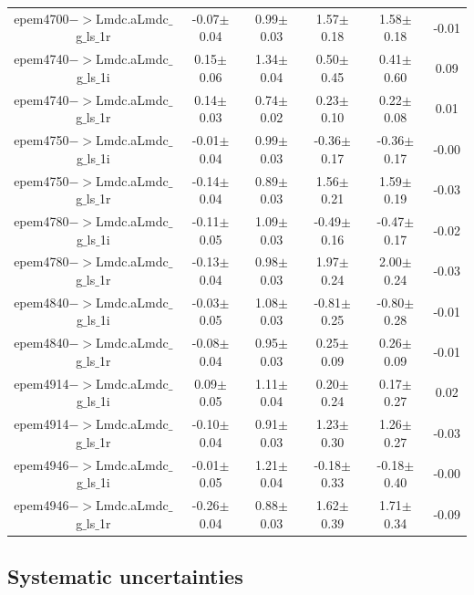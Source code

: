 \begin{table}[h]
{\begin{tabular}{cccccc}
        epem4700$->$Lmdc.aLmdc$\_$g$\_$ls$\_$1r & -0.07$\pm$0.04 & 0.99$\pm$0.03 & 1.57$\pm$0.18 & 1.58$\pm$0.18 & -0.01 \\
        epem4740$->$Lmdc.aLmdc$\_$g$\_$ls$\_$1i & 0.15$\pm$0.06 & 1.34$\pm$0.04 & 0.50$\pm$0.45 & 0.41$\pm$0.60 & 0.09 \\
        epem4740$->$Lmdc.aLmdc$\_$g$\_$ls$\_$1r & 0.14$\pm$0.03 & 0.74$\pm$0.02 & 0.23$\pm$0.10 & 0.22$\pm$0.08 & 0.01 \\
        epem4750$->$Lmdc.aLmdc$\_$g$\_$ls$\_$1i & -0.01$\pm$0.04 & 0.99$\pm$0.03 & -0.36$\pm$0.17 & -0.36$\pm$0.17 & -0.00 \\
        epem4750$->$Lmdc.aLmdc$\_$g$\_$ls$\_$1r & -0.14$\pm$0.04 & 0.89$\pm$0.03 & 1.56$\pm$0.21 & 1.59$\pm$0.19 & -0.03 \\
        epem4780$->$Lmdc.aLmdc$\_$g$\_$ls$\_$1i & -0.11$\pm$0.05 & 1.09$\pm$0.03 & -0.49$\pm$0.16 & -0.47$\pm$0.17 & -0.02 \\
        epem4780$->$Lmdc.aLmdc$\_$g$\_$ls$\_$1r & -0.13$\pm$0.04 & 0.98$\pm$0.03 & 1.97$\pm$0.24 & 2.00$\pm$0.24 & -0.03 \\
        epem4840$->$Lmdc.aLmdc$\_$g$\_$ls$\_$1i & -0.03$\pm$0.05 & 1.08$\pm$0.03 & -0.81$\pm$0.25 & -0.80$\pm$0.28 & -0.01 \\
        epem4840$->$Lmdc.aLmdc$\_$g$\_$ls$\_$1r & -0.08$\pm$0.04 & 0.95$\pm$0.03 & 0.25$\pm$0.09 & 0.26$\pm$0.09 & -0.01 \\
        epem4914$->$Lmdc.aLmdc$\_$g$\_$ls$\_$1i & 0.09$\pm$0.05 & 1.11$\pm$0.04 & 0.20$\pm$0.24 & 0.17$\pm$0.27 & 0.02 \\
        epem4914$->$Lmdc.aLmdc$\_$g$\_$ls$\_$1r & -0.10$\pm$0.04 & 0.91$\pm$0.03 & 1.23$\pm$0.30 & 1.26$\pm$0.27 & -0.03 \\
        epem4946$->$Lmdc.aLmdc$\_$g$\_$ls$\_$1i & -0.01$\pm$0.05 & 1.21$\pm$0.04 & -0.18$\pm$0.33 & -0.18$\pm$0.40 & -0.00 \\
        epem4946$->$Lmdc.aLmdc$\_$g$\_$ls$\_$1r & -0.26$\pm$0.04 & 0.88$\pm$0.03 & 1.62$\pm$0.39 & 1.71$\pm$0.34 & -0.09 \\
        \hline\hline
        \end{tabular}
        }
\end{table}



\clearpage
\subsection{Systematic uncertainties}
\label{sec:systmeatic}

